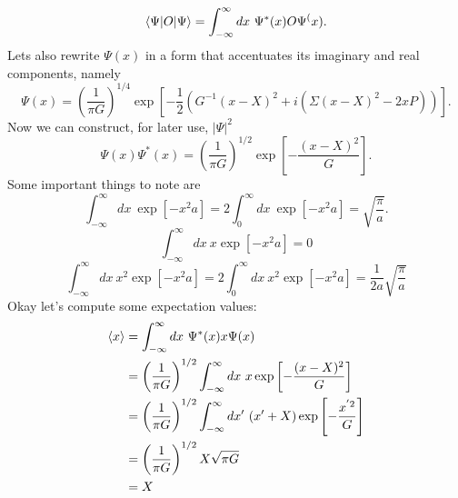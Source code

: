 \documentclass[11pt,letterpaper]{article}
\begin{document}
\begin{enumerate}
\begin{enumerate}
$$\braket{\Psi|O|\Psi} = \int_{-\infty}^{\infty}{dx\ \Psi^*(x)O\Psi^(x)}.$$
Lets also rewrite $\Psi(x)$ in a form that accentuates its imaginary and real components, namely
\begin{equation}\label{17}\Psi(x) = \left(\frac{1}{\pi G}\right)^{1/4}\exp{\left[-\frac{1}{2}\left(G^{-1}(x-X)^2+i(\Sigma(x-X)^2-2xP)\right)\right]}.
\end{equation}
Now we can construct, for later use, $|\Psi|^2$
\begin{equation}\label{18}\Psi(x)\Psi^*(x) = \left(\frac{1}{\pi G}\right)^{1/2}\exp{\left[-\frac{(x-X)^2}{G}\right]}.\end{equation}
Some important things to note are
$$\int_{-\infty}^{\infty}{dx\ \exp{\left[-x^2a\right]}}=2\int_0^\infty{dx\ \exp{\left[-x^2a\right]}}=\sqrt{\frac{\pi}{a}}.$$
$$\int_{-\infty}^{\infty}{dx\ x\exp{\left[-x^2a\right]}}=0$$
$$\int_{-\infty}^{\infty}{dx\ x^2\exp{\left[-x^2a\right]}}=2\int_{0}^{\infty}{dx\ x^2\exp{\left[-x^2a\right]}}=\frac{1}{2a}\sqrt{\frac{\pi}{a}}$$
 Okay let's compute some expectation values:
\begin{align*}\braket{x} &= \int_{-\infty}^{\infty}{dx\ \Psi^*(x)x\Psi(x)}\\
&=\left(\frac{1}{\pi G}\right)^{1/2}\int_{-\infty}^{\infty}{dx\ x\exp{\left[-\frac{(x-X)^2}{G}\right]}}\\
&=\left(\frac{1}{\pi G}\right)^{1/2}\int_{-\infty}^{\infty}{dx'\ (x'+X)\exp{\left[-\frac{x^{'2}}{G}\right]}}\\
&=\left(\frac{1}{\pi G}\right)^{1/2}X\sqrt{\pi G} \\&= X
\end{align*}


\end{enumerate}
\end{enumerate}
\end{document}
